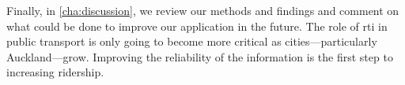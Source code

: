 Finally, in \cref{cha:discussion}, we review our methods and findings and comment on what could be done to improve our application in the future. The role of \gls{rti} in public transport is only going to become more critical as cities---particularly Auckland---grow. Improving the reliability of the information is the first step to increasing ridership.
